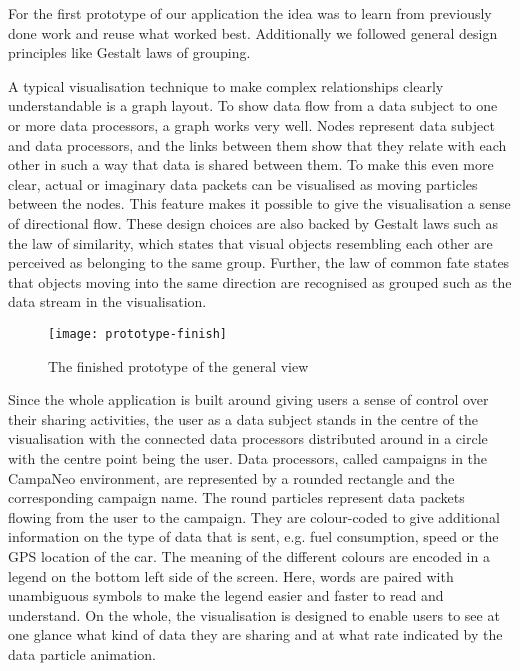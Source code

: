 \documentclass[../paper.tex]{subfiles}
\begin{document}
  For the first prototype of our application the idea was to learn from
  previously done work and reuse what worked best. Additionally we followed
  general design principles like Gestalt laws \cite{wiki:principles_of_grouping}
  of grouping.

  A typical visualisation technique to make complex relationships clearly
  understandable is a graph layout. To show data flow from a data subject to one
  or more data processors, a graph works very well. Nodes represent data
  subject and data processors, and the links between them show that they relate
  with each other in such a way that data is shared between them. To make this
  even more clear, actual or imaginary data packets can be visualised as moving
  particles between the nodes. This feature makes it possible to give the
  visualisation a sense of directional flow.
  These design choices are also backed by Gestalt laws such as the law of
  similarity, which states that visual objects resembling each other are
  perceived as belonging to the same group. Further, the law of common fate
  states that objects moving into the same direction are recognised as grouped
  such as the data stream in the visualisation.

  \begin{figure}[H]
    \centering
    \texttt{[image: prototype-finish]}
    \caption{The finished prototype of the general view}
    \label{fig:prototype-finish}
  \end{figure}

  Since the whole application is built around giving users a sense of control
  over their sharing activities, the user as a data subject stands in the centre of
  the visualisation with the connected data processors distributed around in a
  circle with the centre point
  being the user. Data processors, called campaigns in the CampaNeo environment, are
  represented by a rounded rectangle and the corresponding campaign name. The round
  particles represent data packets flowing from the user to the campaign. They are
  colour-coded to give additional information on the type of data that is sent,
  e.g. fuel consumption, speed or the GPS location of the car.
  The meaning of the different colours are encoded in a legend on the bottom left
  side of the screen. Here, words are paired with unambiguous symbols to make the
  legend easier and faster to read and understand. On the whole, the visualisation
  is designed to enable users to see at one glance what kind of data they are sharing
  and at what rate indicated by the data particle animation.
\end{document}
